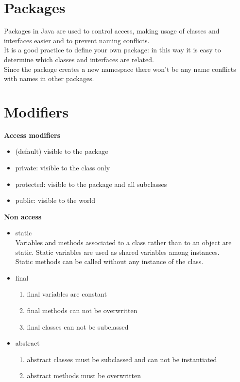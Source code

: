 \documentclass[10pt,a4paper]{book}
\begin{document}
\section{Packages}
Packages in Java are used to control access, making usage of classes and interfaces easier and to prevent naming conflicts.\\
It is a good practice to define your own package: in this way it is easy to determine which classes and interfaces are related.\\
Since the package creates a new namespace there won't be any name conflicts with names in other packages. 
\newpage
\section{Modifiers}
\textbf{Access modifiers}
\begin{itemize}
\item (default) visible to the package
\item private: visible to the class only
\item protected: visible to the package and all subclasses
\item public: visible to the world
\end{itemize}
\textbf{Non access}
\begin{itemize}
\item static\\
Variables and methods associated to a class rather than to an object are static. Static variables are used as shared variables among instances.\\
Static methods can be called without any instance of the class.
\item final
\begin{enumerate}
\item final variables are constant
\item final methods can not be overwritten
\item final classes can not be subclassed
\end{enumerate}
\item abstract
\begin{enumerate}
\item abstract classes must be subclassed and can not be instantiated
\item abstract methods must be overwritten
\end{enumerate}
\end{itemize}
\newpage
\end{document}
